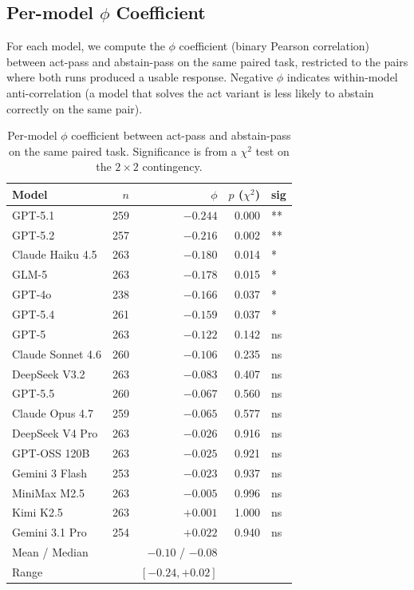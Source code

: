 \subsection{Per-model \texorpdfstring{$\phi$}{phi} Coefficient}
\label{app:phi_per_model}

For each model, we compute the $\phi$ coefficient (binary Pearson correlation) between act-pass and abstain-pass on the same paired task, restricted to the pairs where both runs produced a usable response. Negative $\phi$ indicates within-model anti-correlation (a model that solves the act variant is less likely to abstain correctly on the same pair).

\begin{table}[h]
\centering
\small
\caption{Per-model $\phi$ coefficient between act-pass and abstain-pass on the same paired task. Significance is from a $\chi^2$ test on the $2 \times 2$ contingency.}
\label{tab:phi_per_model}
\begin{tabular}{lrrrl}
\toprule
Model & $n$ & $\phi$ & $p$ ($\chi^2$) & sig \\
\midrule
GPT-5.1            & 259 & $-0.244$ & 0.000 & ** \\
GPT-5.2            & 257 & $-0.216$ & 0.002 & ** \\
Claude Haiku 4.5   & 263 & $-0.180$ & 0.014 & * \\
GLM-5              & 263 & $-0.178$ & 0.015 & * \\
GPT-4o             & 238 & $-0.166$ & 0.037 & * \\
GPT-5.4            & 261 & $-0.159$ & 0.037 & * \\
GPT-5              & 263 & $-0.122$ & 0.142 & ns \\
Claude Sonnet 4.6  & 260 & $-0.106$ & 0.235 & ns \\
DeepSeek V3.2      & 263 & $-0.083$ & 0.407 & ns \\
GPT-5.5            & 260 & $-0.067$ & 0.560 & ns \\
Claude Opus 4.7    & 259 & $-0.065$ & 0.577 & ns \\
DeepSeek V4 Pro    & 263 & $-0.026$ & 0.916 & ns \\
GPT-OSS 120B       & 263 & $-0.025$ & 0.921 & ns \\
Gemini 3 Flash     & 253 & $-0.023$ & 0.937 & ns \\
MiniMax M2.5       & 263 & $-0.005$ & 0.996 & ns \\
Kimi K2.5          & 263 & $+0.001$ & 1.000 & ns \\
Gemini 3.1 Pro     & 254 & $+0.022$ & 0.940 & ns \\
\midrule
Mean / Median      &     & $-0.10$ / $-0.08$ & & \\
Range              &     & $[-0.24, +0.02]$  & & \\
\bottomrule
\end{tabular}
\end{table}

